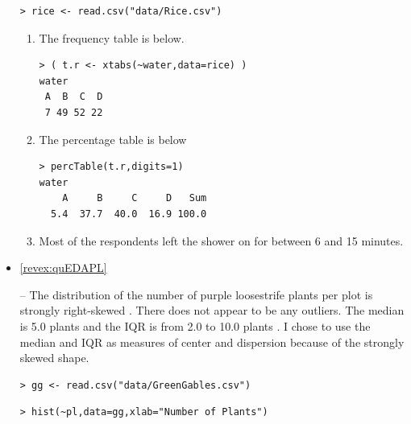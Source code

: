 \documentclass[10pt,openany]{book}\usepackage[]{graphicx}\usepackage[]{color}
\makeatletter
\newenvironment{kframe}{%
 \def\at@end@of@kframe{}%
 \ifinner\ifhmode%
  \def\at@end@of@kframe{\end{minipage}}%
  \begin{minipage}{\columnwidth}%
 \fi\fi%
 \def\FrameCommand##1{\hskip\@totalleftmargin \hskip-\fboxsep
 \colorbox{shadecolor}{##1}\hskip-\fboxsep
     \hskip-\linewidth \hskip-\@totalleftmargin \hskip\columnwidth}%
 \MakeFramed {\advance\hsize-\width
   \@totalleftmargin\z@ \linewidth\hsize
   \@setminipage}}%
 {\par\unskip\endMakeFramed%
 \at@end@of@kframe}
\newenvironment{knitrout}{}{} %
\makeatother
\begin{document}
\begin{itemize}
\begin{knitrout}
\color{fgcolor}\begin{kframe}
\begin{verbatim}
> rice <- read.csv("data/Rice.csv")
\end{verbatim}
\end{kframe}
\end{knitrout}
  \begin{enumerate}
    \item The frequency table is below.
\begin{knitrout}
\color{fgcolor}\begin{kframe}
\begin{verbatim}
> ( t.r <- xtabs(~water,data=rice) )
water
 A  B  C  D 
 7 49 52 22 
\end{verbatim}
\end{kframe}
\end{knitrout}
    \item The percentage table is below
\begin{knitrout}
\color{fgcolor}\begin{kframe}
\begin{verbatim}
> percTable(t.r,digits=1)
water
    A     B     C     D   Sum 
  5.4  37.7  40.0  16.9 100.0 
\end{verbatim}
\end{kframe}
\end{knitrout}
    \item Most of the respondents left the shower on for between 6 and 15 minutes.
  \end{enumerate}


  \item \hypertarget{ans:quEDAPL}{\ref{revex:quEDAPL}} --  The distribution of the number of purple loosestrife plants per plot is strongly right-skewed .  There does not appear to be any outliers.  The median is 5.0 plants and the IQR is from 2.0 to 10.0 plants .  I chose to use the median and IQR as measures of center and dispersion because of the strongly skewed shape.
\begin{knitrout}
\color{fgcolor}\begin{kframe}
\begin{verbatim}
> gg <- read.csv("data/GreenGables.csv")
\end{verbatim}
\end{kframe}
\end{knitrout}
\begin{knitrout}
\color{fgcolor}\begin{kframe}
\begin{verbatim}
> hist(~pl,data=gg,xlab="Number of Plants")
\end{verbatim}
\end{kframe}\begin{figure}[hbtp]


\end{figure}
\end{knitrout}
\end{itemize}
\end{document}
